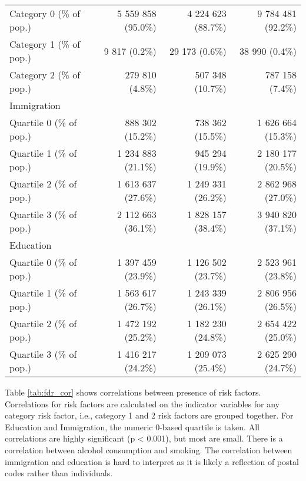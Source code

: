 \documentclass[risks,article,submit,moreauthors,pdftex]{Definitions/mdpi}
\begin{document}
\begin{table}
\begin{longtable}{l|rrr}
\midrule
\hspace*{25px} Category  0 (\% of pop.) & 5 559 858 (95.0\%) & 4 224 623 (88.7\%) & 9 784 481 (92.2\%) \\ 
\hspace*{25px} Category  1 (\% of pop.) & 9 817 (0.2\%) & 29 173 (0.6\%) & 38 990 (0.4\%) \\ 
\hspace*{25px} Category  2 (\% of pop.) & 279 810 (4.8\%) & 507 348 (10.7\%) & 787 158 (7.4\%) \\ 
\midrule
\multicolumn{4}{l}{Immigration} \\ 
\midrule
\hspace*{25px} Quartile  0 (\% of pop.) & 888 302 (15.2\%) & 738 362 (15.5\%) & 1 626 664 (15.3\%) \\ 
\hspace*{25px} Quartile  1 (\% of pop.) & 1 234 883 (21.1\%) & 945 294 (19.9\%) & 2 180 177 (20.5\%) \\ 
\hspace*{25px} Quartile  2 (\% of pop.) & 1 613 637 (27.6\%) & 1 249 331 (26.2\%) & 2 862 968 (27.0\%) \\ 
\hspace*{25px} Quartile  3 (\% of pop.) & 2 112 663 (36.1\%) & 1 828 157 (38.4\%) & 3 940 820 (37.1\%) \\ 
\midrule
\multicolumn{4}{l}{Education} \\ 
\midrule
\hspace*{25px} Quartile  0 (\% of pop.) & 1 397 459 (23.9\%) & 1 126 502 (23.7\%) & 2 523 961 (23.8\%) \\ 
\hspace*{25px} Quartile  1 (\% of pop.) & 1 563 617 (26.7\%) & 1 243 339 (26.1\%) & 2 806 956 (26.5\%) \\ 
\hspace*{25px} Quartile  2 (\% of pop.) & 1 472 192 (25.2\%) & 1 182 230 (24.8\%) & 2 654 422 (25.0\%) \\ 
\hspace*{25px} Quartile  3 (\% of pop.) & 1 416 217 (24.2\%) & 1 209 073 (25.4\%) & 2 625 290 (24.7\%) \\ 
\bottomrule
\end{longtable}
\end{table}

Table \ref{tab:fdr_cor} shows correlations between presence of risk
factors. Correlations for risk factors are calculated on the indicator
variables for any category risk factor, i.e., category 1 and 2 risk
factors are grouped together. For Education and Immigration, the numeric
0-based quartile is taken. All correlations are highly significant (p
\textless{} 0.001), but most are small. There is a correlation between
alcohol consumption and smoking. The correlation between immigration and
education is hard to interpret as it is likely a reflection of postal
codes rather than individuals.
\end{document}
